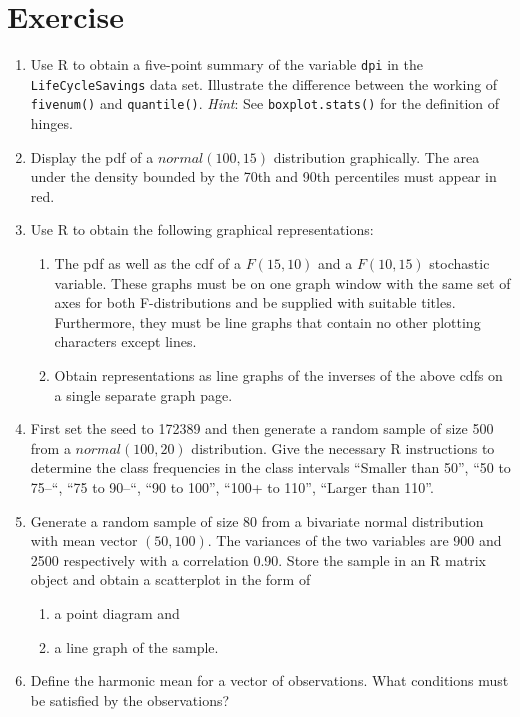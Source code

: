 \documentclass[
]{book}
\providecommand{\tightlist}{%
  \setlength{\itemsep}{0pt}\setlength{\parskip}{0pt}}
\begin{document}
\section{Exercise}\label{exercise-11}

\begin{enumerate}
\def\labelenumi{\arabic{enumi}.}
\item
  Use R to obtain a five-point summary of the variable \texttt{dpi} in the \texttt{LifeCycleSavings} data set. Illustrate the difference between the working of \texttt{fivenum()} and \texttt{quantile()}. \emph{Hint}: See \texttt{boxplot.stats()} for the definition of hinges.
\item
  Display the pdf of a \(normal (100, 15)\) distribution graphically. The area under the density bounded by the 70th and 90th percentiles must appear in red.
\item
  Use R to obtain the following graphical representations:

  \begin{enumerate}
  \def\labelenumii{(\roman{enumii})}
  \item
    The pdf as well as the cdf of a \(F (15, 10)\) and a \(F (10, 15)\) stochastic variable. These graphs must be on one graph window with the same set of axes for both F-distributions and be supplied with suitable titles. Furthermore, they must be line graphs that contain no other plotting characters except lines.
  \item
    Obtain representations as line graphs of the inverses of the above cdfs on a single separate graph page.
  \end{enumerate}
\item
  First set the seed to 172389 and then generate a random sample of size 500 from a \(normal (100, 20)\) distribution. Give the necessary R instructions to determine the class frequencies in the class intervals ``Smaller than 50'', ``50 to 75--``, ``75 to 90--``, ``90 to 100'', ``100+ to 110'', ``Larger than 110''.
\item
  Generate a random sample of size 80 from a bivariate normal distribution with mean vector \((50, 100)\). The variances of the two variables are 900 and 2500 respectively with a correlation 0.90. Store the sample in an R matrix object and obtain a scatterplot in the form of

  \begin{enumerate}
  \def\labelenumii{(\roman{enumii})}
  \tightlist
  \item
    a point diagram and
  \item
    a line graph of the sample.
  \end{enumerate}
\item
  Define the harmonic mean for a vector of observations. What conditions must be satisfied by the observations?


\end{enumerate}
\end{document}
